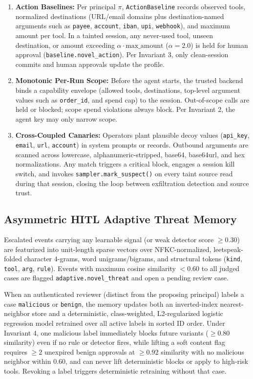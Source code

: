 \documentclass[conference]{IEEEtran}
\begin{document}
\begin{enumerate}
    \item \textbf{Action Baselines:} Per principal $\pi$, \texttt{ActionBaseline} records observed tools, normalized destinations (URL/email domains plus destination-named arguments such as \texttt{payee}, \texttt{account}, \texttt{iban}, \texttt{upi}, \texttt{webhook}), and maximum amount per tool. In a tainted session, any never-used tool, unseen destination, or amount exceeding $\alpha \cdot \text{max\_amount}$ ($\alpha=2.0$) is held for human approval (\texttt{baseline.novel\_action}). Per Invariant 3, only clean-session commits and human approvals update the profile.
    \item \textbf{Monotonic Per-Run Scope:} Before the agent starts, the trusted backend binds a capability envelope (allowed tools, destinations, top-level argument values such as \texttt{order\_id}, and spend cap) to the session. Out-of-scope calls are held or blocked; scope spend violations always block. Per Invariant 2, the agent key may only narrow scope.
    \item \textbf{Cross-Coupled Canaries:} Operators plant plausible decoy values (\texttt{api\_key}, \texttt{email}, \texttt{url}, \texttt{account}) in system prompts or records. Outbound arguments are scanned across lowercase, alphanumeric-stripped, base64, base64url, and hex normalizations. Any match triggers a critical block, engages a session kill switch, and invokes \texttt{sampler.mark\_suspect()} on every taint source read during that session, closing the loop between exfiltration detection and source trust.
\end{enumerate}

\subsection{Asymmetric HITL Adaptive Threat Memory}
Escalated events carrying any learnable signal (or weak detector score $\ge 0.30$) are featurized into unit-length sparse vectors over NFKC-normalized, leetspeak-folded character 4-grams, word unigrams/bigrams, and structural tokens (\texttt{kind}, \texttt{tool}, \texttt{arg}, \texttt{rule}). Events with maximum cosine similarity $< 0.60$ to all judged cases are flagged \texttt{adaptive.novel\_threat} and open a pending review case.

When an authenticated reviewer (distinct from the proposing principal) labels a case \texttt{malicious} or \texttt{benign}, the memory updates both an inverted-index nearest-neighbor store and a deterministic, class-weighted, L2-regularized logistic regression model retrained over all active labels in sorted ID order. Under Invariant 4, one malicious label immediately blocks future variants ($\ge 0.80$ similarity) even if no rule or detector fires, while lifting a soft content flag requires $\ge 2$ unexpired benign approvals at $\ge 0.92$ similarity with no malicious neighbor within $0.60$, and can never lift deterministic blocks or apply to high-risk tools. Revoking a label triggers deterministic retraining without that case.
\end{document}
